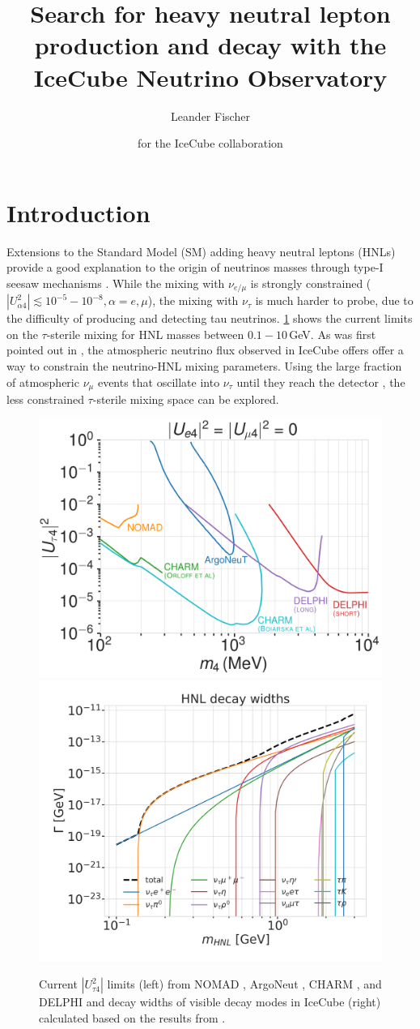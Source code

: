 \documentclass[a4paper,11pt]{article}
\title{Search for heavy neutral lepton production and decay with the IceCube Neutrino Observatory}
\author*[a]{Leander Fischer}
\author{for the IceCube collaboration}
\affiliation[a]{DESY, D-15738 Zeuthen, Germany}
\begin{document}
\maketitle


\section{Introduction}

Extensions to the Standard Model (SM) adding heavy neutral leptons (HNLs) provide a good explanation to the origin of neutrinos masses through type-I seesaw mechanisms \cite{10.1143/PTP.64.1103}. While the mixing with $\nu_{e/\mu}$ is strongly constrained ($|U_{\alpha4}^2| \lesssim 10^{-5}-10^{-8}, \alpha=e,\mu$), the mixing with $\nu_{\tau}$ is much harder to probe, due to the difficulty of producing and detecting tau neutrinos. \cref{fig:hnl_limits_and_decay_widths} shows the current limits on the $\tau$-sterile mixing for HNL masses between $0.1-10\,$GeV. As was first pointed out in \cite{Coloma:2017ppo}, the atmospheric neutrino flux observed in IceCube offers offer a way to constrain the neutrino-HNL mixing parameters. Using the large fraction of atmospheric $\nu_{\mu}$ events that oscillate into $\nu_{\tau}$ until they reach the detector \cite{IceCube:2019dqi}, the less constrained $\tau$-sterile mixing space can be explored.



\begin{figure}[h]
  \includegraphics[width=.50\linewidth]{figures/UtauN_custom_plots_LF_grid_white.png}
  \includegraphics[width=.47\linewidth]{figures/hnl_decay_widths_log.png}
  \label{fig:hnl_visible_decay_widths}
  \caption{Current $|U_{\tau4}^2|$ limits (left) from NOMAD \cite{NOMAD:2001eyx}, ArgoNeut \cite{ArgoNeuT:2021clc}, CHARM \cite{Orloff:2002de, Boiarska:2021yho}, and DELPHI \cite{DELPHI:1996qcc} and decay widths of visible decay modes in IceCube (right) calculated based on the results from \cite{Gorbunov:2007ak}.}
  \label{fig:hnl_limits_and_decay_widths}
\end{figure}
\end{document}

